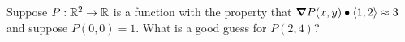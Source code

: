 \documentclass{ximera}
\begin{document}
\begin{problem}
  Suppose $P : \mathbb R^2 \to \mathbb R$ is a function with the property that $\boldsymbol\nabla P(x,y) \bullet \left\langle 1,2\right\rangle\approx 3$ and suppose $P(0,0) = 1$.
  What is a good guess for $P(2,4)$?
  \begin{multipleChoice}
    \pdfOnly{\end{multicols}}
  \end{multipleChoice}
  
  
\end{problem}
\end{document}
